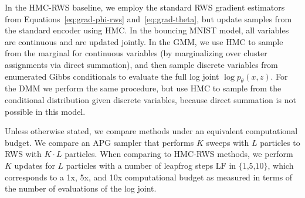 \documentclass{article}
\theoremstyle{definition}
\begin{document}
In the HMC-RWS baseline, we employ the standard RWS gradient estimators from Equations~\ref{eq:grad-phi-rws} and~\ref{eq:grad-theta}, but update samples from the standard encoder using HMC. In the bouncing MNIST model, all variables are continuous and are updated jointly. In the GMM, we use HMC to sample from the marginal for continuous variables (by marginalizing over cluster assignments via direct summation), and then sample discrete variables from enumerated Gibbs conditionals to evaluate the full log joint $\log p_\theta(x,z)$. For the DMM we perform the same procedure, but use HMC to sample from the conditional distribution given discrete variables, because direct summation is not possible in this model. 


Unless otherwise stated, we compare methods under an equivalent computational budget. We compare an APG sampler that performs $K$ sweeps with $L$ particles to RWS with $K \cdot L$ particles. When comparing to HMC-RWS methods, we perform $K$ updates for $L$ particles with a number of leapfrog steps $\text{LF in \{1,5,10\}}$, which corresponds to a 1x, 5x, and 10x computational budget as measured in terms of the number of evaluations of the log joint. 
 



\end{document}
